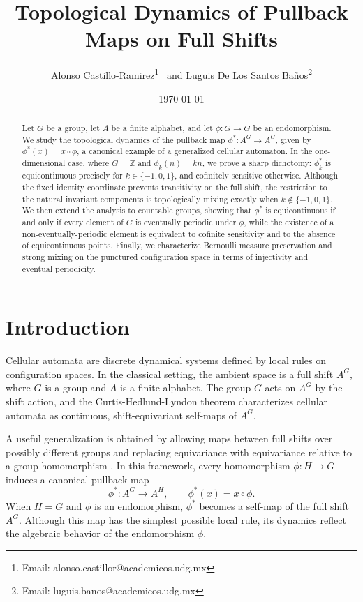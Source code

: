 \documentclass[12pt,a4paper]{article}
\title{Topological Dynamics of Pullback Maps on Full Shifts}
\author{Alonso Castillo-Ramirez\footnote{Email: alonso.castillor@academicos.udg.mx} \ and Luguis De Los Santos Ba\~{n}os\footnote{Email: luguis.banos@academicos.udg.mx}}
\affil{Departamento de Matemáticas, Centro Universitario de Ciencias Exactas e Ingenier\'ias, Universidad de Guadalajara, Guadalajara, M\'exico.}
\date{\today}
\theoremstyle{definition}
\theoremstyle{remark}
\begin{document}
\maketitle

\begin{abstract}
Let $G$ be a group, let $A$ be a finite alphabet, and let $\phi: G \to G$ be an endomorphism. We study the topological dynamics of the pullback map $\phi^* : A^G \to A^G$, given by $\phi^*(x)=x\circ\phi$, a canonical example of a generalized cellular automaton. In the one-dimensional case, where $G=\mathbb Z$ and $\phi_k(n)=kn$, we prove a sharp dichotomy: $\phi_k^*$ is equicontinuous precisely for $k\in\{-1,0,1\}$, and cofinitely sensitive otherwise. Although the fixed identity coordinate prevents transitivity on the full shift, the restriction to the natural invariant components is topologically mixing exactly when $k\notin\{-1,0,1\}$. We then extend the analysis to countable groups, showing that $\phi^*$ is equicontinuous if and only if every element of $G$ is eventually periodic under $\phi$, while the existence of a non-eventually-periodic element is equivalent to cofinite sensitivity and to the absence of equicontinuous points. Finally, we characterize Bernoulli measure preservation and strong mixing on the punctured configuration space in terms of injectivity and eventual periodicity.
\end{abstract}

\section{Introduction}

Cellular automata are discrete dynamical systems defined by local rules on configuration spaces. In the classical setting, the ambient space is a full shift $A^G$, where $G$ is a group and $A$ is a finite alphabet. The group $G$ acts on $A^G$ by the shift action, and the Curtis-Hedlund-Lyndon theorem characterizes cellular automata as continuous, shift-equivariant self-maps of $A^G$.

A useful generalization is obtained by allowing maps between full shifts over possibly different groups and replacing equivariance with equivariance relative to a group homomorphism \cite{AlonsoAngelAlejandro}. In this framework, every homomorphism $\phi:H\to G$ induces a canonical pullback map
\[
\phi^*:A^G\to A^H,\qquad \phi^*(x)=x\circ\phi.
\]
When $H=G$ and $\phi$ is an endomorphism, $\phi^*$ becomes a self-map of the full shift $A^G$. Although this map has the simplest possible local rule, its dynamics reflect the algebraic behavior of the endomorphism $\phi$.
\end{document}

